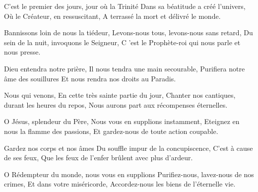 \documentclass[psautier_nocturne_fr.tex]{subfiles}
\begin{document}






C'est le premier des jours, jour où la Trinité
Dans sa béatitude a créé l'univers,
Où le Créateur, en ressuscitant,
A terrassé la mort et délivré le monde.

Bannissons loin de nous la tiédeur,
Levons-nous tous, levons-nous sans retard,
Du sein de la nuit, invoquons le Seigneur,
C 'est le Prophète-roi qui nous parle et nous presse.

Dieu entendra notre prière,
Il nous tendra une main secourable,
Purifiera notre âme des souillures
Et nous rendra nos droits au Paradis.

Nous qui venons,
En cette très sainte partie du jour,
Chanter nos cantiques, durant les heures du repos,
Nous aurons part aux récompenses éternelles.

O Jésus, splendeur du Père,
Nous vous en supplions instamment,
Eteignez en nous la flamme des passions,
Et gardez-nous de toute action coupable.

Gardez nos corps et nos âmes
Du souffle impur de la concupiscence,
C'est à cause de ses feux,
Que les feux de l'enfer brûlent avec plus d'ardeur.

O Rédempteur du monde, nous vous en supplions
Purifiez-nous, lavez-nous de nos crimes,
Et dans votre miséricorde,
Accordez-nous les biens de l'éternelle vie.
\end{document}
